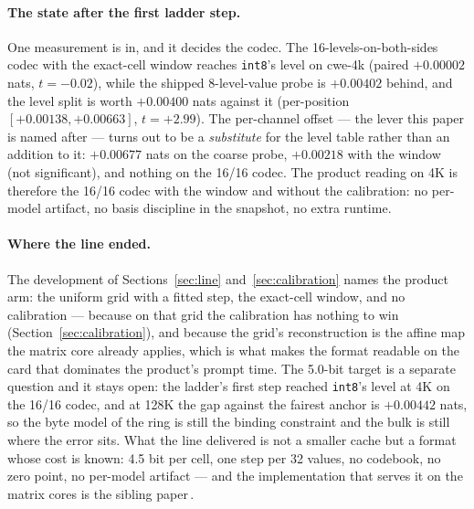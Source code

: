\documentclass[10pt,twocolumn]{article}
\begin{document}
\paragraph{The state after the first ladder step.} One measurement is in, and it decides the codec. The 16-levels-on-both-sides codec with the exact-cell window reaches \texttt{int8}'s level on cwe-4k (paired $+0.00002$ nats, $t = -0.02$), while the shipped 8-level-value probe is $+0.00402$ behind, and the level split is worth $+0.00400$ nats against it (per-position $[+0.00138, +0.00663]$, $t = +2.99$). The per-channel offset --- the lever this paper is named after --- turns out to be a \emph{substitute} for the level table rather than an addition to it: $+0.00677$ nats on the coarse probe, $+0.00218$ with the window (not significant), and nothing on the 16/16 codec. The product reading on 4K is therefore the 16/16 codec with the window and without the calibration: no per-model artifact, no basis discipline in the snapshot, no extra runtime.


\paragraph{Where the line ended.} The development of Sections~\ref{sec:line} and~\ref{sec:calibration} names
the product arm: the uniform grid with a fitted step, the exact-cell window, and no calibration --- because on
that grid the calibration has nothing to win (Section~\ref{sec:calibration}), and because the grid's
reconstruction is the affine map the matrix core already applies, which is what makes the format readable on
the card that dominates the product's prompt time. The 5.0-bit target is a separate question and it stays
open: the ladder's first step reached \texttt{int8}'s level at 4K on the 16/16 codec, and at 128K the gap
against the fairest anchor is $+0.00442$ nats, so the byte model of the ring is still the binding constraint
and the bulk is still where the error sits. What the line delivered is not a smaller cache but a format
whose cost is known: 4.5 bit per cell, one step per 32 values, no codebook, no zero point, no per-model
artifact --- and the implementation that serves it on the matrix cores is the sibling paper\,\cite{q4u32paper}.
\end{document}

